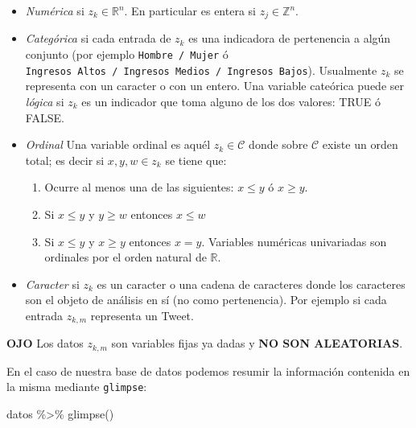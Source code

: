 \documentclass[
]{book}
\newenvironment{Shaded}{\begin{snugshade}}{\end{snugshade}}
\newcommand{\FunctionTok}[1]{\textcolor[rgb]{0.00,0.00,0.00}{#1}}
\newcommand{\NormalTok}[1]{#1}
\newcommand{\SpecialCharTok}[1]{\textcolor[rgb]{0.00,0.00,0.00}{#1}}
\providecommand{\tightlist}{%
  \setlength{\itemsep}{0pt}\setlength{\parskip}{0pt}}
\begin{document}
\begin{itemize}
\item
  \emph{Numérica} si \(z_{k} \in \mathbb{R}^{n}\). En particular es entera si \(z_{j} \in \mathbb{Z}^{n}\).
\item
  \emph{Categórica} si cada entrada de \(z_{k}\) es una indicadora de pertenencia a algún conjunto (por ejemplo \texttt{Hombre\ /\ Mujer} ó \texttt{Ingresos\ Altos\ /\ Ingresos\ Medios\ /\ Ingresos\ Bajos}). Usualmente \(z_{k}\) se representa con un caracter o con un entero. Una variable cateórica puede ser \emph{lógica} si \(z_{k}\) es un indicador que toma alguno de los dos valores: TRUE ó FALSE.
\item
  \emph{Ordinal} Una variable ordinal es aquél \(z_{k} \in \mathcal{C}\) donde sobre \(\mathcal{C}\) existe un orden total; es decir si \(x,y,w\in z_{k}\) se tiene que:

  \begin{enumerate}
  \def\labelenumi{\alph{enumi}.}
  \tightlist
  \item
    Ocurre al menos una de las siguientes: \(x \leq y\) ó \(x \geq y\).
  \item
    Si \(x \leq y\) y \(y \geq w\) entonces \(x \leq w\)
  \item
    Si \(x \leq y\) y \(x \geq y\) entonces \(x = y\).
    Variables numéricas univariadas son ordinales por el orden natural de \(\mathbb{R}\).
  \end{enumerate}
\item
  \emph{Caracter} si \(z_{k}\) es un caracter o una cadena de caracteres donde los caracteres son el objeto de análisis en sí (no como pertenencia). Por ejemplo si cada entrada \(z_{k,m}\) representa un Tweet.
\end{itemize}

\textbf{OJO} Los datos \(z_{k,m}\) son variables fijas ya dadas y \textbf{NO SON ALEATORIAS}.

En el caso de nuestra base de datos podemos resumir la información contenida en la misma mediante \texttt{glimpse}:

\begin{Shaded}
\begin{Highlighting}[]
\NormalTok{datos }\SpecialCharTok{\%\textgreater{}\%} \FunctionTok{glimpse}\NormalTok{()}
\end{Highlighting}
\end{Shaded}
\end{document}
